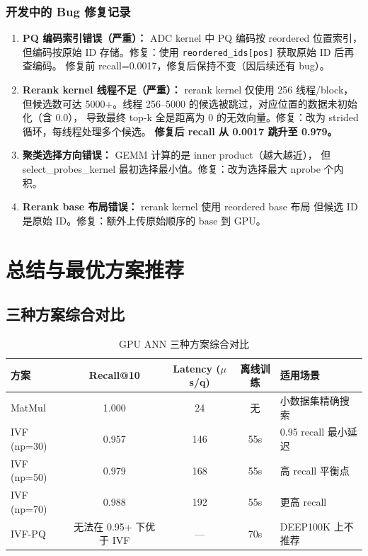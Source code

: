 \documentclass[UTF8,a4paper,10pt]{ctexart}
\begin{document}
\subsubsection{开发中的 Bug 修复记录}

\begin{enumerate}[itemsep=0pt]
\item \textbf{PQ 编码索引错误（严重）：} ADC kernel 中 PQ 编码按 reordered 位置索引，
但编码按原始 ID 存储。修复：使用 \texttt{reordered\_ids[pos]} 获取原始 ID 后再查编码。
修复前 recall=0.0017，修复后保持不变（因后续还有 bug）。

\item \textbf{Rerank kernel 线程不足（严重）：} rerank kernel 仅使用 256 线程/block，
但候选数可达 5000+。线程 256--5000 的候选被跳过，对应位置的数据未初始化（含 0.0），
导致最终 top-k 全是距离为 0 的无效向量。修复：改为 strided 循环，每线程处理多个候选。
\textbf{修复后 recall 从 0.0017 跳升至 0.979。}

\item \textbf{聚类选择方向错误：} GEMM 计算的是 inner product（越大越近），
但 select\_probes\_kernel 最初选择最小值。修复：改为选择最大 nprobe 个内积。

\item \textbf{Rerank base 布局错误：} rerank kernel 使用 reordered base 布局
但候选 ID 是原始 ID。修复：额外上传原始顺序的 base 到 GPU。
\end{enumerate}

\section{总结与最优方案推荐}
\label{sec:conclusion}

\subsection{三种方案综合对比}

\begin{table}[H]
\centering
\caption{GPU ANN 三种方案综合对比}
\label{tab:comparison}
\begin{tabular}{p{2.2cm}cccp{2.5cm}}
\toprule
方案 & Recall@10 & Latency ($\mu$s/q) & 离线训练 & 适用场景 \\
\midrule
MatMul & 1.000 & 24 & 无 & 小数据集精确搜索 \\
IVF (np=30) & 0.957 & 146 & 55s & 0.95 recall 最小延迟 \\
IVF (np=50) & 0.979 & 168 & 55s & 高 recall 平衡点 \\
IVF (np=70) & 0.988 & 192 & 55s & 更高 recall \\
IVF-PQ & 无法在 0.95+ 下优于 IVF & — & 70s & DEEP100K 上不推荐 \\
\bottomrule
\end{tabular}
\end{table}
\end{document}
